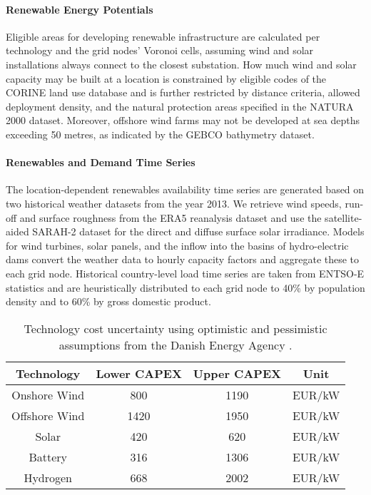 
\paragraph{Renewable Energy Potentials}
Eligible areas for developing renewable infrastructure are calculated
per technology and the grid nodes' Voronoi cells, assuming wind and solar installations always connect to the closest substation.
How much wind and solar capacity may be built at a location is constrained by
eligible codes of the CORINE land use database and is further restricted by distance criteria,
allowed deployment density, and the natural protection areas specified in the NATURA 2000 dataset.
Moreover, offshore wind farms may not be developed at sea depths exceeding 50 metres,
as indicated by the GEBCO bathymetry dataset.


\paragraph{Renewables and Demand Time Series}
The location-dependent renewables availability time series are generated
based on two historical weather datasets from the year 2013.
We retrieve wind speeds, run-off and surface roughness from the ERA5 reanalysis dataset and
use the satellite-aided SARAH-2 dataset for the direct and diffuse surface solar irradiance.
Models for wind turbines, solar panels, and the inflow into the basins of hydro-electric dams
convert the weather data to hourly capacity factors and aggregate these to each grid node.
Historical country-level load time series are taken from ENTSO-E statistics and are
heuristically distributed to each grid node to 40\% by population density and to 60\% by gross domestic product.


\begin{SCtable}
    \begin{small}
        \begin{tabular}{cccc}
            \toprule
            Technology & Lower CAPEX & Upper CAPEX & Unit  \\ \midrule
            Onshore Wind & 800 & 1190 & EUR/kW \\
            Offshore Wind & 1420 & 1950 & EUR/kW \\ %
            Solar & 420 & 620 & EUR/kW \\
            Battery & 316 & 1306 & EUR/kW \\
            Hydrogen & 668 & 2002 & EUR/kW \\ \bottomrule
        \end{tabular}
    \end{small}
    \caption[Technology Cost Uncertainty]{Technology cost uncertainty using optimistic and pessimistic assumptions from the Danish Energy Agency \cite{DEA}.}
    \label{tab:costuncertainty}
\end{SCtable}

